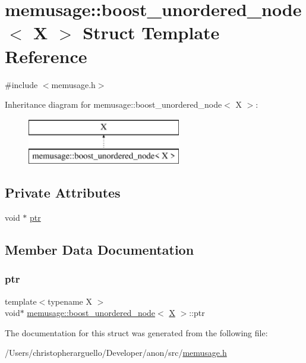 \hypertarget{structmemusage_1_1boost__unordered__node}{}\section{memusage\+:\+:boost\+\_\+unordered\+\_\+node$<$ X $>$ Struct Template Reference}
\label{structmemusage_1_1boost__unordered__node}


{\ttfamily \#include $<$memusage.\+h$>$}

Inheritance diagram for memusage\+:\+:boost\+\_\+unordered\+\_\+node$<$ X $>$\+:\begin{figure}[H]
\begin{center}
\leavevmode
\includegraphics[height=2.000000cm]{structmemusage_1_1boost__unordered__node}
\end{center}
\end{figure}
\subsection*{Private Attributes}
\begin{DoxyCompactItemize}
\item 
void $\ast$ \mbox{\hyperlink{structmemusage_1_1boost__unordered__node_a6331d9429d8f7d815bcd6ccdb0a6f536}{ptr}}
\end{DoxyCompactItemize}


\subsection{Member Data Documentation}
\mbox{\label{structmemusage_1_1boost__unordered__node_a6331d9429d8f7d815bcd6ccdb0a6f536}} 
\subsubsection{\texorpdfstring{ptr}{ptr}}
{\footnotesize\ttfamily template$<$typename X $>$ \\
void$\ast$ \mbox{\hyperlink{structmemusage_1_1boost__unordered__node}{memusage\+::boost\+\_\+unordered\+\_\+node}}$<$ \mbox{\hyperlink{net_8cpp_a826edd40636cbaa44266b97c8c6a4fa3}{X}} $>$\+::ptr\hspace{0.3cm}{\ttfamily [private]}}



The documentation for this struct was generated from the following file\+:\begin{DoxyCompactItemize}
\item 
/\+Users/christopherarguello/\+Developer/anon/src/\mbox{\hyperlink{memusage_8h}{memusage.\+h}}\end{DoxyCompactItemize}
